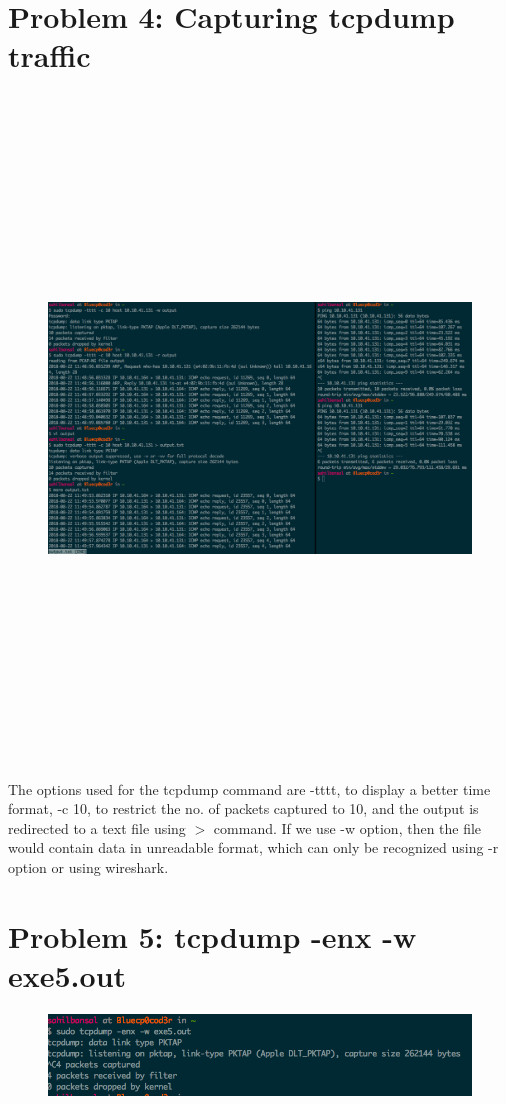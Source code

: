 \documentclass[]{report}
\begin{document}
\section{Problem 4: Capturing tcpdump traffic}
\begin{figure}[H]
	\vspace{0pt}
	\includegraphics[height=500pt, width=600pt, center]{Snapshots/exe4/tcpdump.png}
\end{figure}
The options used for the tcpdump command are -tttt, to display a better time format, -c 10, to restrict the no. of packets captured to 10, and the output is redirected to a text file using $>$ command. If we use -w option, then the file would contain data in unreadable format, which can only be recognized using -r option or using wireshark. 

\section{Problem 5: tcpdump -enx -w exe5.out}
\begin{figure}[H]
	\vspace{0pt}
	\includegraphics[width=600pt, keepaspectratio, center]{Snapshots/exe5/tcpdump_w.png}
\end{figure}
\end{document}
